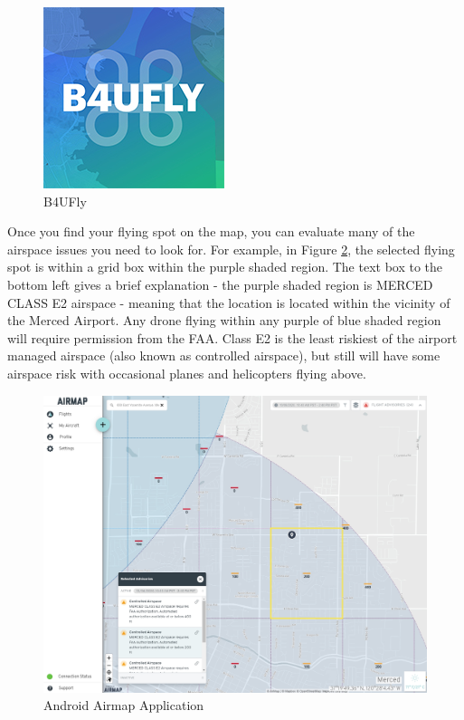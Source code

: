 \documentclass[
  12pt,
]{book}
\begin{document}
\begin{figure}

{\centering \includegraphics[width=0.5\linewidth]{images/B4UFLYlogo} 

}

\caption{B4UFly}\label{fig:b4ufly}
\end{figure}

Once you find your flying spot on the map, you can evaluate many of the airspace issues you need to look for. For example, in Figure \ref{fig:airmap-web}, the selected flying spot is within a grid box within the purple shaded region.
The text box to the bottom left gives a brief explanation - the purple shaded region is MERCED CLASS E2 airspace - meaning that the location is located within the vicinity of the Merced Airport. Any drone flying within any purple of blue shaded region will require permission from the FAA. Class E2 is the least riskiest of the airport managed airspace (also known as controlled airspace), but still will have some airspace risk with occasional planes and helicopters flying above.

\begin{figure}

{\centering \includegraphics[width=0.85\linewidth]{images/Airmap-webpage} 

}

\caption{Android Airmap Application}\label{fig:airmap-web}
\end{figure}
\end{document}
